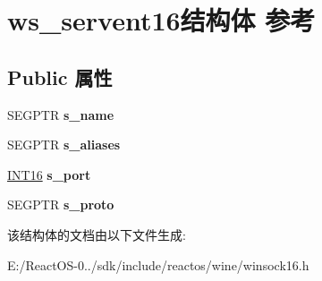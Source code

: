 \hypertarget{structws__servent16}{}\section{ws\+\_\+servent16结构体 参考}
\label{structws__servent16}
\subsection*{Public 属性}
\begin{DoxyCompactItemize}
\item 
\mbox{\label{structws__servent16_a1c18159c7f0692bc201b76d565d437d7}} 
S\+E\+G\+P\+TR {\bfseries s\+\_\+name}
\item 
\mbox{\label{structws__servent16_a2e997ea0d9d7e95d34aa06e94733791c}} 
S\+E\+G\+P\+TR {\bfseries s\+\_\+aliases}
\item 
\mbox{\label{structws__servent16_a4dce68d155ba7dd3ea2204d8a8d63c97}} 
\hyperlink{_processor_bind_8h_a30f500129d8c688af07726d5d34ce52d}{I\+N\+T16} {\bfseries s\+\_\+port}
\item 
\mbox{\label{structws__servent16_a29af3ec42759058247df9f1e2a2b28c3}} 
S\+E\+G\+P\+TR {\bfseries s\+\_\+proto}
\end{DoxyCompactItemize}


该结构体的文档由以下文件生成\+:\begin{DoxyCompactItemize}
\item 
E\+:/\+React\+O\+S-\/0../sdk/include/reactos/wine/winsock16.\+h\end{DoxyCompactItemize}

